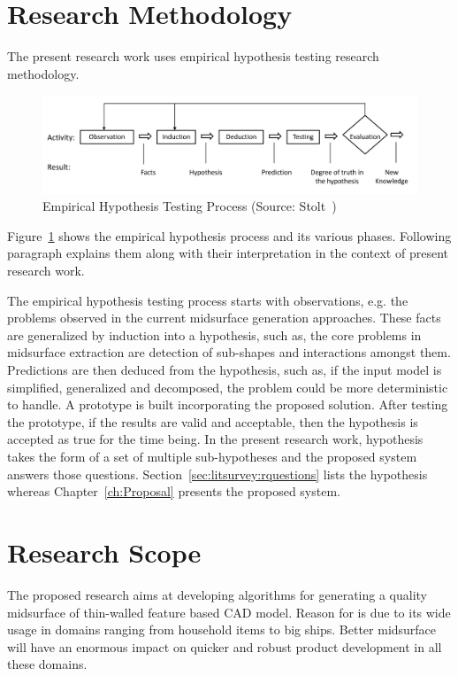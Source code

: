 \section{Research Methodology} \label{sec:introduction:rm}
The present research work uses empirical hypothesis testing research methodology. 


	\begin{figure} [!h]
		\centering
		\includegraphics[width=0.9\linewidth]{..//Common/images/ResearchMethodology.png}
		\caption{Empirical Hypothesis Testing Process (Source: Stolt~\cite{Stolt2008})}
		\label{fig:introduction:ResearchMethodology}
	\end{figure}

	
Figure~\ref{fig:introduction:ResearchMethodology} shows the empirical hypothesis process and its various phases. Following paragraph explains them along with their interpretation in the context of present research work. 

The empirical hypothesis testing process starts with observations, e.g. the problems observed in the current midsurface generation approaches. These facts are generalized by induction into a hypothesis, such as, the core problems in midsurface extraction are detection of sub-shapes and interactions amongst them. Predictions are then deduced from the hypothesis, such as, if the input model is simplified, generalized and decomposed, the problem could be more deterministic to handle.  A prototype is built incorporating the proposed solution. After testing the prototype, if the results are valid and acceptable, then the hypothesis is accepted as true for the time being. In the present research work, hypothesis takes the form of a set of multiple sub-hypotheses and the proposed system answers those questions. Section~\ref{sec:litsurvey:rquestions} lists the hypothesis whereas Chapter~\ref{ch:Proposal} presents the proposed system.

 \section{Research Scope}
The proposed research aims at developing algorithms for generating a quality midsurface of thin-walled  feature based CAD model.  Reason for  is due to its wide usage in domains ranging from household items to big ships.  Better midsurface will have an enormous impact on quicker and robust product development in all these domains.


